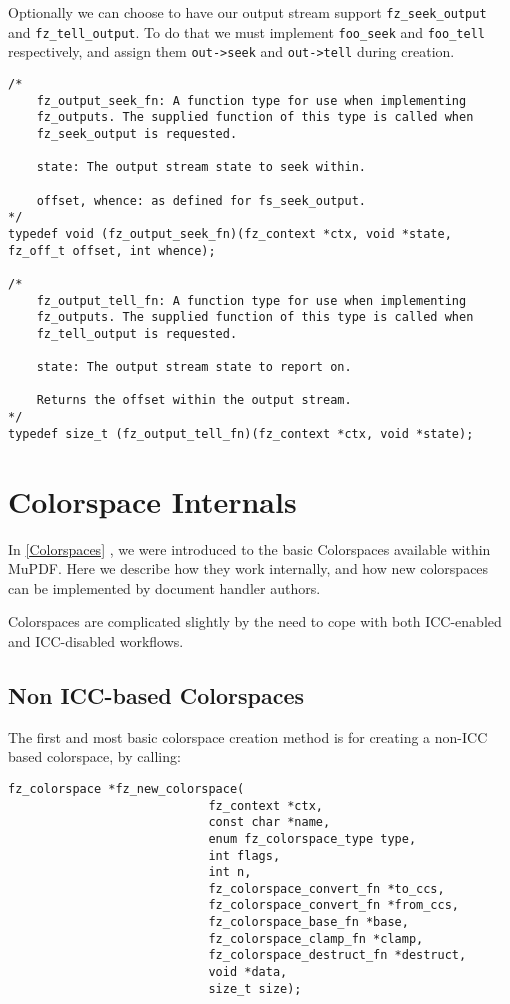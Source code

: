 \documentclass[oneside]{book}
\newcommand{\rjwref}[1] {\autoref{#1} \nameref{#1}}
\begin{document}
Optionally we can choose to have our output stream support \texttt{fz\_seek\_output} and \texttt{fz\_tell\_output}. To do that we must implement \texttt{foo\_seek} and \texttt{foo\_tell} respectively, and assign them \texttt{out->seek} and \texttt{out->tell} during creation.

\begin{lstlisting}
/*
	fz_output_seek_fn: A function type for use when implementing
	fz_outputs. The supplied function of this type is called when
	fz_seek_output is requested.

	state: The output stream state to seek within.

	offset, whence: as defined for fs_seek_output.
*/
typedef void (fz_output_seek_fn)(fz_context *ctx, void *state, fz_off_t offset, int whence);

/*
	fz_output_tell_fn: A function type for use when implementing
	fz_outputs. The supplied function of this type is called when
	fz_tell_output is requested.

	state: The output stream state to report on.

	Returns the offset within the output stream.
*/
typedef size_t (fz_output_tell_fn)(fz_context *ctx, void *state);
\end{lstlisting}

\chapter{Colorspace Internals}
\label{ColorspaceInternals}

In \rjwref{Colorspaces}, we were introduced to the basic Colorspaces available within MuPDF. Here we describe how they work internally, and how new colorspaces can be implemented by document handler authors.

Colorspaces are complicated slightly by the need to cope with both ICC-enabled and ICC-disabled workflows.

\section{Non ICC-based Colorspaces}

The first and most basic colorspace creation method is for creating a non-ICC based colorspace, by calling:

\begin{lstlisting}
fz_colorspace *fz_new_colorspace(
							fz_context *ctx,
							const char *name,
							enum fz_colorspace_type type,
							int flags,
							int n,
							fz_colorspace_convert_fn *to_ccs,
							fz_colorspace_convert_fn *from_ccs,
							fz_colorspace_base_fn *base,
							fz_colorspace_clamp_fn *clamp,
							fz_colorspace_destruct_fn *destruct,
							void *data,
							size_t size);
\end{lstlisting}
\end{document}
